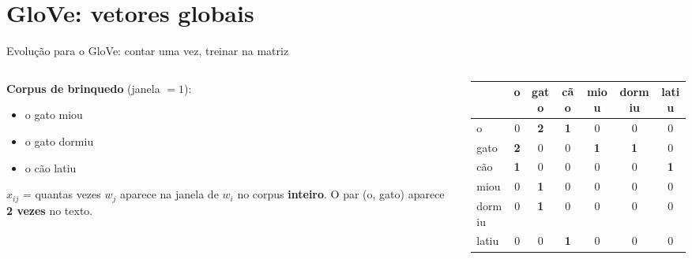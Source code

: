 
\newcommand{\nz}[1]{\textbf{\color{dexpiBlue}#1}}

\section{GloVe: vetores globais}

\begin{frame}{Evolução para o GloVe: contar uma vez, treinar na matriz}
    \begin{columns}[c]
        \begin{column}{0.40\textwidth}
            \small
            \textbf{Corpus de brinquedo} (janela $= 1$):
            \begin{itemize}
                \item o gato miou
                \item o gato dormiu
                \item o cão latiu
            \end{itemize}
            \vspace{0.1cm}
            \footnotesize
            $x_{ij}$ = quantas vezes $w_j$ aparece na janela de $w_i$ no corpus \textbf{inteiro}.
            O par (o, gato) aparece \textbf{2 vezes} no texto.
        \end{column}
        \begin{column}{0.58\textwidth}
            \centering
            \footnotesize
            \begin{tabular}{l|cccccc}
                \toprule
                & o & gato & cão & miou & dormiu & latiu \\
                \midrule
                o      & 0 & \nz{2} & \nz{1} & 0 & 0 & 0 \\
                gato   & \nz{2} & 0 & 0 & \nz{1} & \nz{1} & 0 \\
                cão    & \nz{1} & 0 & 0 & 0 & 0 & \nz{1} \\
                miou   & 0 & \nz{1} & 0 & 0 & 0 & 0 \\
                dormiu & 0 & \nz{1} & 0 & 0 & 0 & 0 \\
                latiu  & 0 & 0 & \nz{1} & 0 & 0 & 0 \\
                \bottomrule
            \end{tabular}


\end{column}
\end{columns}
\end{frame}
